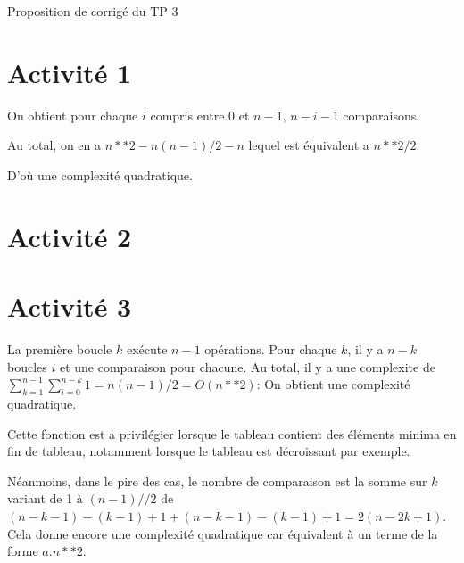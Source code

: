 
	
\begin{Large}
	Proposition de corrigé du TP 3
\end{Large}


\section*{Activité 1}



\eject 



On obtient pour chaque $i$ compris entre 0 et $n-1$, $n-i-1$ comparaisons.

Au total, on en a $n**2-n(n-1)/2-n$ lequel est équivalent a $n**2/2$.

D'où une complexité quadratique.


\eject

\section*{Activité 2}



\eject \section*{Activité 3}



La première boucle $k$ ex\'ecute $n-1$ opérations. Pour chaque $k$, il y a $n-k$ boucles $i$ et une comparaison pour chacune. Au total, il y a une complexite de $\displaystyle\sum_{k=1}^{n-1}\sum_{i=0}^{n-k} 1 =n(n-1)/2 = O(n**2)$:
On obtient une complexité quadratique.



Cette fonction est a privilégier lorsque le tableau contient des éléments minima en fin de tableau, notamment lorsque le tableau est décroissant par exemple.

Néanmoins, dans le pire des cas, le nombre de comparaison est la somme sur $k$ variant de 1 à $(n-1)//2$ de $(n-k-1)-(k-1)+1+(n-k-1)-(k-1)+1=2(n-2k+1)$. Cela donne encore une complexité quadratique car équivalent à un terme de la forme $a.n**2$.



